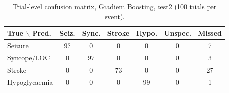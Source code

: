 \begin{table}[t]
\centering
\footnotesize
\caption{Trial-level confusion matrix, Gradient Boosting, test2 (100 trials per event).}
\label{tab:cm_hgb}
\begin{tabular}{lcccccc}
\hline
True $\backslash$ Pred. & Seiz. & Sync. & Stroke & Hypo. & Unspec. & Missed \\
\hline
Seizure & 93 & 0 & 0 & 0 & 0 & 7 \\
Syncope/LOC & 0 & 97 & 0 & 0 & 0 & 3 \\
Stroke & 0 & 0 & 73 & 0 & 0 & 27 \\
Hypoglycaemia & 0 & 0 & 0 & 99 & 0 & 1 \\
\hline
\end{tabular}
\end{table}
